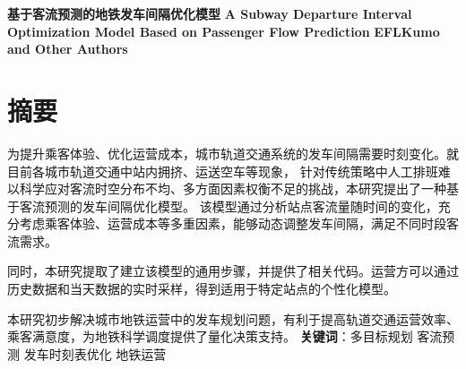 \thispagestyle{empty}   %

\begin{center}
    \textbf{\fontsize{20}{1.5}基于客流预测的地铁发车间隔优化模型}
    \newline
    \textbf{\fontsize{12}{1.5}A Subway Departure Interval Optimization Model Based on Passenger Flow Prediction}
    \newline
    \textbf{\fontsize{12}{1.5}EFLKumo and Other Authors}

\end{center}





%
%


\section*{摘要}

为提升乘客体验、优化运营成本，城市轨道交通系统的发车间隔需要时刻变化。就目前各城市轨道交通中站内拥挤、运送空车等现象，
针对传统策略中人工排班难以科学应对客流时空分布不均、多方面因素权衡不足的挑战，本研究提出了一种基于客流预测的发车间隔优化模型。
该模型通过分析站点客流量随时间的变化，充分考虑乘客体验、运营成本等多重因素，能够动态调整发车间隔，满足不同时段客流需求。

同时，本研究提取了建立该模型的通用步骤，并提供了相关代码。运营方可以通过历史数据和当天数据的实时采样，得到适用于特定站点的个性化模型。

本研究初步解决城市地铁运营中的发车规划问题，有利于提高轨道交通运营效率、乘客满意度，为地铁科学调度提供了量化决策支持。\newline
\newline
\textbf{关键词}：多目标规划 \quad 客流预测 \quad 发车时刻表优化 \quad 地铁运营